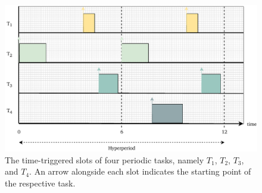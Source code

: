    \begin{figure}[t]
    \centering
    \includegraphics[width=1\textwidth]{figures/timetriggered_v3.pdf}
    \caption{The time-triggered slots of four periodic tasks, namely $T_1$, $T_2$, $T_3$, and $T_4$. An arrow alongside each slot indicates the starting point of the respective task. }
    \label{fig22}
    \end{figure}



